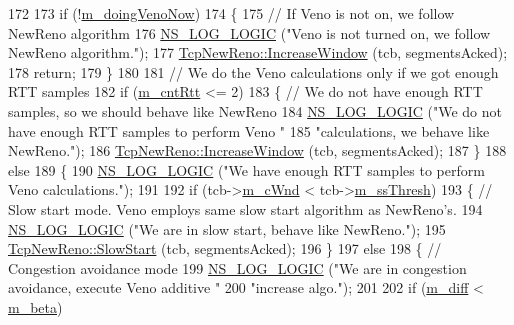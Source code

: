 \begin{DoxyCode}
172 
173   \textcolor{keywordflow}{if} (!\hyperlink{classns3_1_1TcpVeno_aaf29a4f390edec44d3b5db1a70a5d119}{m\_doingVenoNow})
174     \{
175       \textcolor{comment}{// If Veno is not on, we follow NewReno algorithm}
176       \hyperlink{group__logging_ga88acd260151caf2db9c0fc84997f45ce}{NS\_LOG\_LOGIC} (\textcolor{stringliteral}{"Veno is not turned on, we follow NewReno algorithm."});
177       \hyperlink{classns3_1_1TcpNewReno_a11db8ae90f4cebacc15524a793b0741a}{TcpNewReno::IncreaseWindow} (tcb, segmentsAcked);
178       \textcolor{keywordflow}{return};
179     \}
180 
181   \textcolor{comment}{// We do the Veno calculations only if we got enough RTT samples}
182   \textcolor{keywordflow}{if} (\hyperlink{classns3_1_1TcpVeno_a56ba63c2e02200d19b808741c1f68c64}{m\_cntRtt} <= 2)
183     \{    \textcolor{comment}{// We do not have enough RTT samples, so we should behave like NewReno}
184       \hyperlink{group__logging_ga88acd260151caf2db9c0fc84997f45ce}{NS\_LOG\_LOGIC} (\textcolor{stringliteral}{"We do not have enough RTT samples to perform Veno "}
185                     \textcolor{stringliteral}{"calculations, we behave like NewReno."});
186       \hyperlink{classns3_1_1TcpNewReno_a11db8ae90f4cebacc15524a793b0741a}{TcpNewReno::IncreaseWindow} (tcb, segmentsAcked);
187     \}
188   \textcolor{keywordflow}{else}
189     \{
190       \hyperlink{group__logging_ga88acd260151caf2db9c0fc84997f45ce}{NS\_LOG\_LOGIC} (\textcolor{stringliteral}{"We have enough RTT samples to perform Veno calculations."});
191 
192       \textcolor{keywordflow}{if} (tcb->\hyperlink{classns3_1_1TcpSocketState_a7cd3d2156a483c1db436097477a0fd7f}{m\_cWnd} < tcb->\hyperlink{classns3_1_1TcpSocketState_aec003b6dba9d269bfb1036c7652ffbd6}{m\_ssThresh})
193         \{ \textcolor{comment}{// Slow start mode. Veno employs same slow start algorithm as NewReno's.}
194           \hyperlink{group__logging_ga88acd260151caf2db9c0fc84997f45ce}{NS\_LOG\_LOGIC} (\textcolor{stringliteral}{"We are in slow start, behave like NewReno."});
195           \hyperlink{classns3_1_1TcpNewReno_a1cf5fd9585eb3b745727f4f5beae0706}{TcpNewReno::SlowStart} (tcb, segmentsAcked);
196         \}
197       \textcolor{keywordflow}{else}
198         \{ \textcolor{comment}{// Congestion avoidance mode}
199           \hyperlink{group__logging_ga88acd260151caf2db9c0fc84997f45ce}{NS\_LOG\_LOGIC} (\textcolor{stringliteral}{"We are in congestion avoidance, execute Veno additive "}
200                         \textcolor{stringliteral}{"increase algo."});
201 
202           \textcolor{keywordflow}{if} (\hyperlink{classns3_1_1TcpVeno_ae98841fe53c815c3d754675d2857ac80}{m\_diff} < \hyperlink{classns3_1_1TcpVeno_ad041620f3dc6988923c412d8a4183f36}{m\_beta})

\end{DoxyCode}
